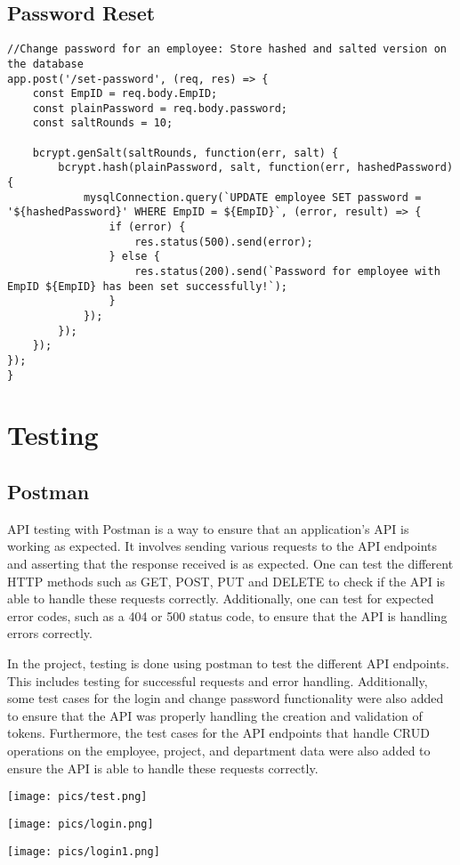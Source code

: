 \documentclass[12pt]{article}
\begin{document}
\subsection*{Password Reset}
\begin{lstlisting}[frame=single]
//Change password for an employee: Store hashed and salted version on the database
app.post('/set-password', (req, res) => {
	const EmpID = req.body.EmpID;
	const plainPassword = req.body.password;
	const saltRounds = 10;
	
	bcrypt.genSalt(saltRounds, function(err, salt) {
		bcrypt.hash(plainPassword, salt, function(err, hashedPassword) {
			mysqlConnection.query(`UPDATE employee SET password = '${hashedPassword}' WHERE EmpID = ${EmpID}`, (error, result) => {
				if (error) {
					res.status(500).send(error);
				} else {
					res.status(200).send(`Password for employee with EmpID ${EmpID} has been set successfully!`);
				}
			});
		});
	});
});
}
\end{lstlisting}
\section*{Testing}
\subsection*{Postman}
API testing with Postman is a way to ensure that an application's API is working as expected. It involves sending various requests to the API endpoints and asserting that the response received is as expected. One can test the different HTTP methods such as GET, POST, PUT and DELETE to check if the API is able to handle these requests correctly. Additionally, one can test for expected error codes, such as a 404 or 500 status code, to ensure that the API is handling errors correctly.

In the project, testing is done using postman to test the different API endpoints. This includes testing for successful requests and error handling. Additionally, some test cases for the login and change password functionality were also added to ensure that the API was properly handling the creation and validation of tokens. Furthermore, the test cases for the API endpoints that handle CRUD operations on the employee, project, and department data were also added to ensure the API is able to handle these requests correctly.
\begin{center}
\texttt{[image: pics/test.png]}
\end{center}
\begin{center}
\texttt{[image: pics/login.png]}
\end{center}
\begin{center}
\texttt{[image: pics/login1.png]}
\end{center}
\end{document}
